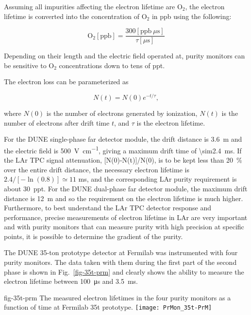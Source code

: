 Assuming all impurities affecting the electron lifetime are $\text{O}_2$, the electron lifetime is converted into the concentration of $\text{O}_2$ in \si{ppb} using the following:

$$ \text{O}_2 [\text{ppb}] = \frac{300 [\text{ppb}~\mu \text{s}]}{\tau [\mu \text{s}]}$$

Depending on their length and the electric field operated at, purity monitors can be sensitive to $\text{O}_2$ concentrations down to tens of \si{ppt}. 

The electron loss can be parameterized as

$$N(t) = N(0)e^{-t/\tau},$$

where $N(0)$ is the number of electrons generated by ionization, $N(t)$ is the number of electrons after drift time $t$, and $\tau$ is the electron lifetime. 

For the DUNE single-phase far detector module, the drift distance is \SI{3.6}{\meter} and the electric field is \SI{500}{\volt\per\centi\meter}, giving a maximum drift time of \SI{\sim2.4}{\milli\second}. If the LAr TPC signal attenuation, [N(0)-N(t)]/N(0), is to be kept less than \SI{20}{\percent} over the entire drift distance, the necessary electron lifetime is $2.4/[-\ln(0.8)] \simeq 11 $ ms, and the corresponding LAr purity requirement is about \SI{30}{ppt}. For the DUNE dual-phase far detector module, the maximum drift distance is \SI{12}{\meter} and so the requirement on the electron lifetime is much higher. Furthermore, to best understand the LAr TPC detector response and performance, precise measurements of electron lifetime in LAr are very important and with purity monitors that can measure purity with high precision at specific points, it is possible to determine the gradient of the purity.

The DUNE 35-ton prototype detector at Fermilab was instrumented with four purity monitors. The data taken with them during the first part of the second phase is shown in Fig.~\ref{fig-35t-prm} and clearly shows the ability to measure the electron lifetime between \SI{100}{\micro\second} and \SI{3.5}{\milli\second}.  

\begin{dunefigure}{fig-35t-prm}
  {The measured electron lifetimes in the four purity monitors as a function of time at Fermilab 35\si{t} prototype.}
  \texttt{[image: PrMon\_35t-PrM]}%
\end{dunefigure}



